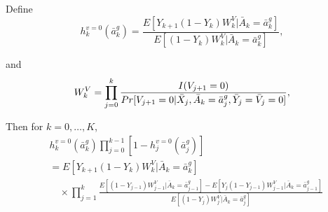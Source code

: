 \begin{tcolorbox}[title=Lemma 1: General IPW formula]

Define
\[h_k^{v=0}(\bar{a}^g_k) = \frac{E[Y_{k+1}(1 - Y_k)W_k^V|\bar{A}_k = \bar{a}^g_k]}{E[(1 - Y_k)W_k^V|\bar{A}_k = \bar{a}^g_k]},\]

\noindent and
\begin{align*}
W_k^V = \prod_{j=0}^k \frac{I(V_{j+1} = 0)}{Pr[V_{j+1} = 0|\bar{X}_j, \bar{A}_k = \bar{a}^g_j, \bar{Y}_j = \Bar{V}_j = 0]},
\end{align*}

\noindent Then for $k = 0, \ldots, K$,
\begin{align*}
&h_k^{v=0}(\bar{a}^g_k) \prod_{j=0}^{k-1} [1 - h_j^{v=0}(\bar{a}^g_j)] \\ 
&= E[Y_{k+1}(1 - Y_k)W_k^V|\bar{A}_k = \bar{a}^g_k] \\
& \quad \times \prod_{j=1}^k \frac{E[(1 - Y_{j-1})W_{j-1}^V|\bar{A}_k = \bar{a}^g_{j-1}] - E[Y_j(1 - Y_{j-1})W_{j-1}^V|\bar{A}_k = \bar{a}^g_{j-1}]}{E[(1 - Y_j)W_j^V|\bar{A}_k = \bar{a}^g_j]}
\end{align*}
\end{tcolorbox}

